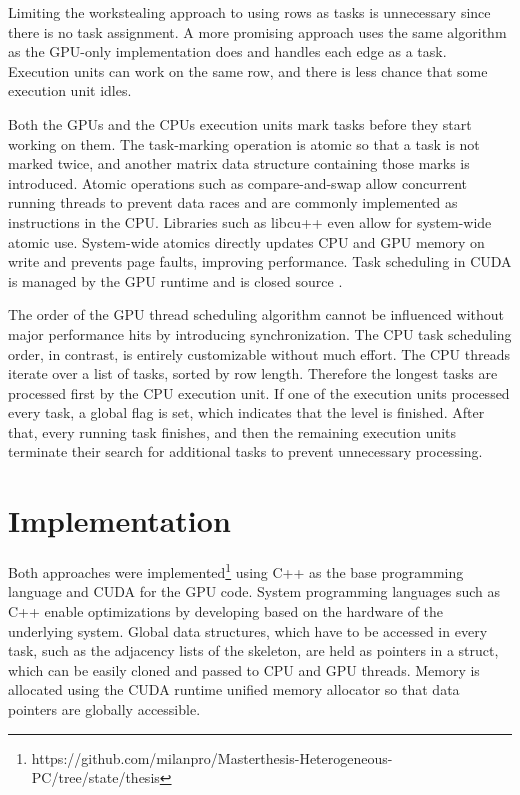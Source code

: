 Limiting the workstealing approach to using rows as tasks is unnecessary since there is no task assignment. A more promising approach uses the same algorithm as the GPU-only implementation does and handles each edge as a task. Execution units can work on the same row, and there is less chance that some execution unit idles.

Both the GPUs and the CPUs execution units mark tasks before they start working on them. The task-marking operation is atomic so that a task is not marked twice, and another matrix data structure containing those marks is introduced. Atomic operations such as compare-and-swap allow concurrent running threads to prevent data races and are commonly implemented as instructions in the CPU.
Libraries such as libcu++ \cite{NVIDIALibcudacxx2021} even allow for system-wide atomic use. System-wide atomics directly updates CPU and GPU memory on write and prevents page faults, improving performance.
Task scheduling in CUDA is managed by the GPU runtime and is closed source \cite{olmedoDissectingCUDAScheduling2020}.

The order of the GPU thread scheduling algorithm cannot be influenced without major performance hits by introducing synchronization. The CPU task scheduling order, in contrast, is entirely customizable without much effort. The CPU threads iterate over a list of tasks, sorted by row length. Therefore the longest tasks are processed first by the CPU execution unit.
If one of the execution units processed every task, a global flag is set, which indicates that the level is finished. After that, every running task finishes, and then the remaining execution units terminate their search for additional tasks to prevent unnecessary processing.


\section{Implementation}
Both approaches were implemented\footnote{https://github.com/milanpro/Masterthesis-Heterogeneous-PC/tree/state/thesis} using C++ as the base programming language and CUDA for the GPU code. System programming languages such as C++ enable optimizations by developing based on the hardware of the underlying system. Global data structures, which have to be accessed in every task, such as the adjacency lists of the skeleton, are held as pointers in a struct, which can be easily cloned and passed to CPU and GPU threads. Memory is allocated using the CUDA runtime unified memory allocator so that data pointers are globally accessible.

